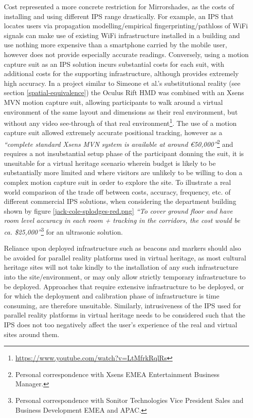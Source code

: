 Cost represented a more concrete restriction for Mirrorshades, as the costs of installing and using different IPS range drastically. For example, an IPS that locates users via propagation modelling/empirical fingerprinting/pathloss of WiFi signals can make use of existing WiFi infrastructure installed in a building and use nothing more expensive than a smartphone carried by the mobile user, however does not provide especially accurate readings. Conversely, using a motion capture suit as an IPS solution incurs substantial costs for each suit, with additional costs for the supporting infrastructure, although provides extremely high accuracy. In a project similar to Simeone et al.'s substitutional reality (see section \ref{spatial-equivalence}) the Oculus Rift HMD was combined with an Xsens MVN motion capture suit, allowing participants to walk around a virtual environment of the same layout and dimensions as their real environment, but without any video see-through of that real environment\footnote{\url{https://www.youtube.com/watch?v=LtMfrkRqlRs}}. The use of a motion capture suit allowed extremely accurate positional tracking, however as a \textit{``complete standard Xsens MVN system is available at around \euro{}50,000''}\footnote{Personal correspondence with Xsens EMEA Entertainment Business Manager.} and requires a not insubstantial setup phase of the participant donning the suit, it is unsuitable for a virtual heritage scenario wherein budget is likely to be substantially more limited and  where visitors are unlikely to be willing to don a complex motion capture suit in order to explore the site. To illustrate a real world comparison of the trade off between costs, accuracy, frequency, etc. of different commercial IPS solutions, when considering the department building shown by figure \ref{jack-cole-splodges-red.png} \textit{``To cover ground floor and have room level accuracy in each room + tracking in the corridors, the cost would be ca. \$25,000''}\footnote{Personal correspondence with Sonitor Technologies Vice President Sales and Business Development EMEA and APAC.} for an ultrasonic solution.

Reliance upon deployed infrastructure such as beacons and markers should also be avoided for parallel reality platforms used in virtual heritage, as most cultural heritage sites will not take kindly to the installation of any such infrastructure into the site/environment, or may only allow strictly temporary infrastructure to be deployed. Approaches that require extensive infrastructure to be deployed, or for which the deployment and calibration phase of infrastructure is time consuming, are therefore unsuitable. Similarly, intrusiveness of the IPS used for parallel reality platforms in virtual heritage needs to be considered such that the IPS does not too negatively affect the user's experience of the real and virtual sites around them.

